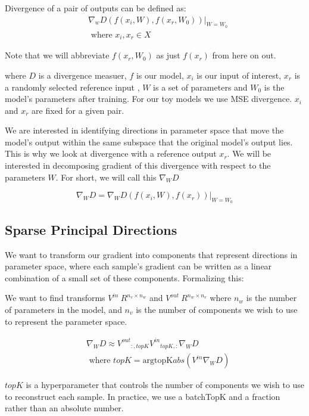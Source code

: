 \documentclass{article}
\theoremstyle{plain}
\theoremstyle{definition}
\theoremstyle{remark}
\begin{document}
Divergence of a pair of outputs can be defined as:
\begin{align}
    &\nabla_w D(f(x_i, W), f(x_r, W_0))|_{W=W_0} \\
    &\text{ where } x_i, x_r \in X
\end{align}


Note that we will abbreviate $f(x_r, W_0)$ as just $f(x_r)$ from here on out.

where $D$ is a divergence measuer, $f$ is our model, $x_i$ is our input of interest, $x_r$ is a randomly selected reference input , $W$ is a set of parameters and $W_0$ is the model's parameters after training. For our toy models we use MSE divergence. $x_i$ and $x_r$ are fixed for a given pair.

 We are interested in identifying directions in parameter space that move the model's output within the same subspace that the original model's output lies. This is why we look at divergence with a reference output $x_r$. We will be interested in decomposing gradient of this divergence with respect to the parameters $W$. For short, we will call this $\nabla_W D$

\begin{equation}
    \nabla_W D = \nabla_W D(f(x_i, W), f(x_r))|_{W=W_0}
\end{equation}

\subsection{Sparse Principal Directions}
We want to transform our gradient into components that represent directions in parameter space, where each sample's gradient can be written as a linear combination of a small set of these components. Formalizing this:

We want to find transforms $V^{in} ~ R^{n_v \times n_w}$ and $V^{out} ~ R^{n_w \times n_v}$ where $n_w$ is the number of parameters in the model, and $n_v$ is the number of components we wish to use to represent the parameter space.

\begin{align}
    & \nabla_W D \approx {V^{out}}_{:, topK} {V^{in}}_{topK,:} \nabla_W D \\
    & \text{ where } topK = \text{argtopK} abs({V^{in}} \nabla_W D)
\end{align}


$topK$ is a hyperparameter that controls the number of components we wish to use to reconstruct each sample. In practice, we use a batchTopK \cite{} and a fraction rather than an absolute number.
\end{document}
